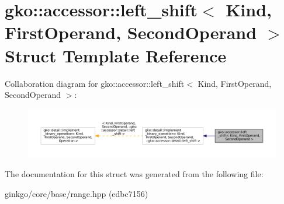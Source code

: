\hypertarget{structgko_1_1accessor_1_1left__shift}{}\section{gko\+:\+:accessor\+:\+:left\+\_\+shift$<$ Kind, First\+Operand, Second\+Operand $>$ Struct Template Reference}
\label{structgko_1_1accessor_1_1left__shift}


Collaboration diagram for gko\+:\+:accessor\+:\+:left\+\_\+shift$<$ Kind, First\+Operand, Second\+Operand $>$\+:
\nopagebreak
\begin{figure}[H]
\begin{center}
\leavevmode
\includegraphics[width=350pt]{structgko_1_1accessor_1_1left__shift__coll__graph}
\end{center}
\end{figure}


The documentation for this struct was generated from the following file\+:\begin{DoxyCompactItemize}
\item 
ginkgo/core/base/range.\+hpp (edbc7156)\end{DoxyCompactItemize}
